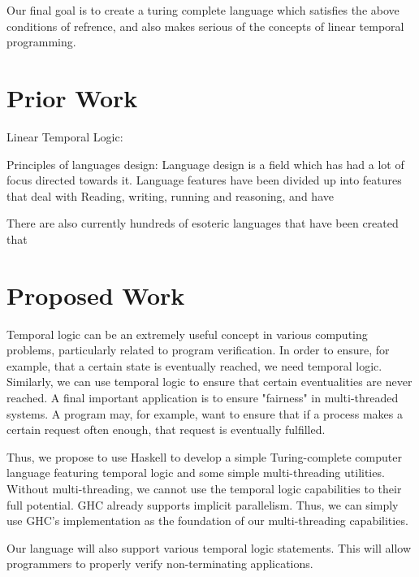 \documentclass[numbers]{sigplanconf}
\begin{document}
Our final goal is to create a turing complete language which satisfies
the above conditions of refrence, and also makes serious of the
concepts of linear temporal programming.

\section{Prior Work}

Linear Temporal Logic:


Principles of languages design:
Language design is a field which has had a lot of focus directed
towards it. Language features have been divided up into features that
deal with Reading, writing, running and reasoning, and have 

There are also currently hundreds of esoteric languages that
have been created that 



\section{Proposed Work}
Temporal logic can be an extremely useful concept in various computing problems, particularly related to program verification. In order to ensure, for example, that a certain state is eventually reached, we need temporal logic. Similarly, we can use temporal logic to ensure that certain eventualities are never reached. A final important application is to ensure "fairness" in multi-threaded systems. A program may, for example, want to ensure that if a process makes a certain request often enough, that request is eventually fulfilled.

Thus, we propose to use Haskell to develop a simple Turing-complete computer language featuring temporal logic and some simple multi-threading utilities. Without multi-threading, we cannot use the temporal logic capabilities to their full potential. GHC already supports implicit parallelism. Thus, we can simply use GHC's implementation as the foundation of our multi-threading capabilities. 

Our language will also support various temporal logic statements. This will allow programmers to properly verify non-terminating applications. 
\end{document}
